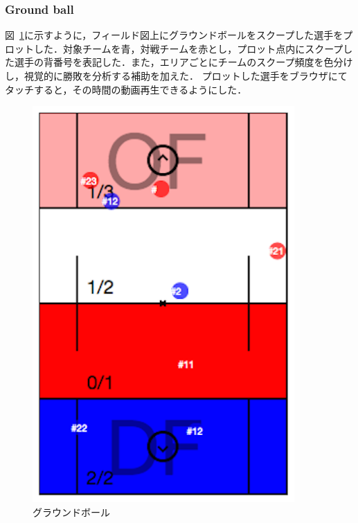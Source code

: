 \documentclass[sotsuron]{kuee}
\begin{document}
			\subsubsection{Ground ball}
				図~\ref{fig:gb}に示すように，フィールド図上にグラウンドボールをスクープした選手をプロットした．対象チームを青，対戦チームを赤とし，プロット点内にスクープした選手の背番号を表記した．また，エリアごとにチームのスクープ頻度を色分けし，視覚的に勝敗を分析する補助を加えた．
				プロットした選手をブラウザにてタッチすると，その時間の動画再生できるようにした．
					\begin{figure}
						\begin{center}
							\includegraphics[width=10cm]{./png/gb.png}
						\end{center}
						\caption{グラウンドボール}
				  		\label{fig:gb}
					\end{figure}
\end{document}
